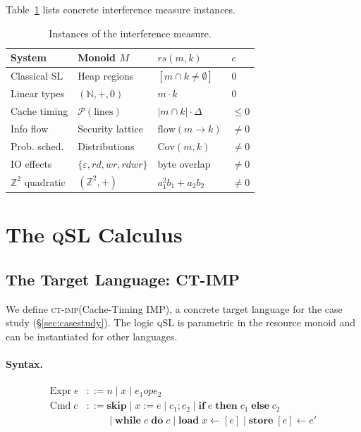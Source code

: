 \documentclass[acmsmall,sigplan,anonymous,review,screen]{acmart}
\theoremstyle{plain}
\theoremstyle{definition}
\newcommand{\qSL}{\textsc{qSL}\xspace}
\newcommand{\CTIMP}{\textsc{ct-imp}\xspace}
\newcommand{\rs}{\mathit{rs}}
\begin{document}
Table~\ref{tab:instances} lists concrete interference measure instances.

\begin{table}[t]
  \caption{Instances of the interference measure.}
  \label{tab:instances}
  \centering\small
  \begin{tabular}{@{}p{2cm}p{2cm}p{2.5cm}p{1.5cm}@{}}
    \toprule
    System & Monoid $M$ & $\rs(m, k)$ & $c$ \\
    \midrule
    Classical SL & Heap regions & $[m \cap k \neq \emptyset]$ & $0$ \\
    Linear types & $(\mathbb{N}, +, 0)$ & $m \cdot k$ & $0$ \\
    Cache timing & $\mathcal{P}(\text{lines})$ & $|m \cap k| \cdot \Delta$ & $\leq 0$ \\
    Info flow & Security lattice & $\mathrm{flow}(m \to k)$ & $\neq 0$ \\
    Prob. sched. & Distributions & $\mathrm{Cov}(m, k)$ & $\neq 0$ \\
    IO effects & $\{\varepsilon,\mathit{rd},\mathit{wr},\mathit{rdwr}\}$ & byte overlap & $\neq 0$ \\
    $\mathbb{Z}^2$ quadratic & $(\mathbb{Z}^2, +)$ & $a_1^2 b_1 + a_2 b_2$ & $\neq 0$ \\
    \bottomrule
  \end{tabular}
\end{table}

\section{The \qSL Calculus}
\label{sec:qsl}

\subsection{The Target Language: CT-IMP}
\label{sec:qsl:language}

We define \CTIMP (Cache-Timing IMP), a concrete target language for the
case study (\S\ref{sec:casestudy}).  The logic \qSL is parametric in the
resource monoid and can be instantiated for other languages.

\paragraph{Syntax.}
\begin{align*}
  \text{Expr}\;e &::= n \mid x \mid e_1 \mathbin{\mathit{op}} e_2 \\
  \text{Cmd}\;c  &::= \mathbf{skip} \mid x \mathbin{:=} e \mid c_1 ; c_2
                      \mid \mathbf{if}\; e\; \mathbf{then}\; c_1\; \mathbf{else}\; c_2 \\
                 &\phantom{::=}\mid \mathbf{while}\; e\; \mathbf{do}\; c
                      \mid \mathbf{load}\; x \mathbin{\leftarrow} [e]
                      \mid \mathbf{store}\; [e] \mathbin{\leftarrow} e'
\end{align*}
\end{document}
